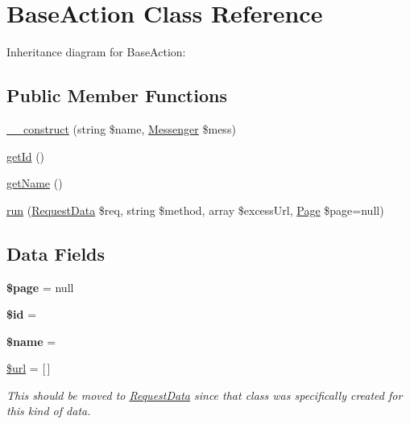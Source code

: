 \hypertarget{class_lora_1_1_base_action}{}\section{Base\+Action Class Reference}
\label{class_lora_1_1_base_action}


Inheritance diagram for Base\+Action\+:
\subsection*{Public Member Functions}
\begin{DoxyCompactItemize}
\item 
\hyperlink{class_lora_1_1_base_action_a605a9aac4f379b8beeef22a91ad9f0ff}{\+\_\+\+\_\+construct} (string \$name, \hyperlink{class_lora_1_1_messenger}{Messenger} \$mess)
\item 
\hyperlink{class_lora_1_1_base_action_a12251d0c022e9e21c137a105ff683f13}{get\+Id} ()
\item 
\hyperlink{class_lora_1_1_base_action_a3d0963e68bb313b163a73f2803c64600}{get\+Name} ()
\item 
\hyperlink{class_lora_1_1_base_action_af22d6f78c304d3bf1eb1f3f4716b824f}{run} (\hyperlink{class_request_data}{Request\+Data} \$req, string \$method, array \$excess\+Url, \hyperlink{class_lora_1_1_page}{Page} \$page=null)
\end{DoxyCompactItemize}
\subsection*{Data Fields}
\begin{DoxyCompactItemize}
\item 
\mbox{\label{class_lora_1_1_base_action_a0a44e6760141442bb439b1ab1395d8ff}} 
{\bfseries \$page} = null
\item 
\mbox{\label{class_lora_1_1_base_action_ae97941710d863131c700f069b109991e}} 
{\bfseries \$id} = \textquotesingle{}\textquotesingle{}
\item 
\mbox{\label{class_lora_1_1_base_action_ab2fc40d43824ea3e1ce5d86dee0d763b}} 
{\bfseries \$name} = \textquotesingle{}\textquotesingle{}
\item 
\mbox{\label{class_lora_1_1_base_action_acf215f34a917d014776ce684a9ee8909}} 
\hyperlink{class_lora_1_1_base_action_acf215f34a917d014776ce684a9ee8909}{\$url} = \mbox{[}$\,$\mbox{]}
\begin{DoxyCompactList}\small\item\em This should be moved to \hyperlink{class_request_data}{Request\+Data} since that class was specifically created for this kind of data. \end{DoxyCompactList}\end{DoxyCompactItemize}
